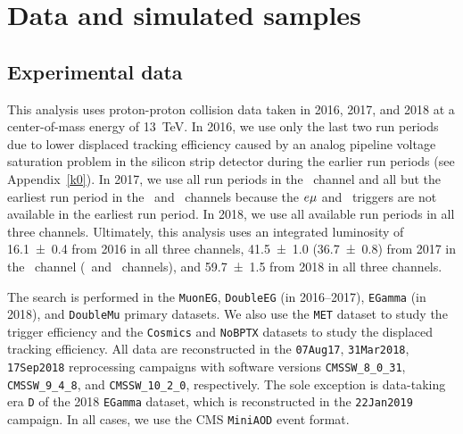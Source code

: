 \section{Data and simulated samples}
\label{samples}

\subsection{Experimental data}
This analysis uses proton-proton collision data taken in 2016, 2017, and 2018 at a center-of-mass energy of \SI{13}{\TeV}. In 2016, we use only the last two run periods due to lower displaced tracking efficiency caused by an analog pipeline voltage saturation problem in the silicon strip detector during the earlier run periods (see Appendix~\ref{k0}). In 2017, we use all run periods in the \Pe\Pe\ channel and all but the earliest run period in the \Pe\Pgm\ and \Pgm\Pgm\ channels because the $e{\mu}$ and \Pgm\Pgm\ triggers are not available in the earliest run period. In 2018, we use all available run periods in all three channels. Ultimately, this analysis uses an integrated luminosity of \SI{16.1\pm0.4}{\fb} from 2016 in all three channels, \SI{41.5\pm1.0}{\fb} (\SI{36.7\pm0.8}{\fb}) from 2017 in the \Pe\Pe\ channel (\Pe\Pgm\ and \Pgm\Pgm\ channels), and \SI{59.7\pm1.5}{\fb} from 2018 in all three channels.

The search is performed in the \texttt{MuonEG}, \texttt{DoubleEG} (in 2016--2017), \texttt{EGamma} (in 2018), and \texttt{DoubleMu} primary datasets. We also use the \texttt{MET} dataset to study the trigger efficiency and the \texttt{Cosmics} and \texttt{NoBPTX} datasets to study the displaced tracking efficiency. All data are reconstructed in the \texttt{07Aug17}, \texttt{31Mar2018}, \texttt{17Sep2018} reprocessing campaigns with software versions \texttt{CMSSW\_8\_0\_31}, \texttt{CMSSW\_9\_4\_8}, and \texttt{CMSSW\_10\_2\_0}, respectively. The sole exception is data-taking era \texttt{D} of the 2018 \texttt{EGamma} dataset, which is reconstructed in the \texttt{22Jan2019} campaign. In all cases, we use the CMS \texttt{MiniAOD} event format.

